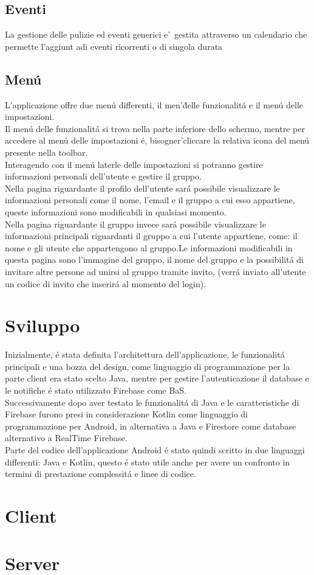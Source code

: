 \subsection{Eventi}
La gestione delle pulizie ed eventi generici e'\ gestita attraverso un calendario
che permette l'aggiunt adi eventi ricorrenti o di singola durata




\subsection{Men\'u}
L'applicazione offre due men\'u differenti, il men'\u delle funzionalit\'a e il men\'u delle impostazioni.\\
Il men\'u delle funzionalit\'a si trova nella parte inferiore dello schermo, mentre per accedere al men\'u delle impostazioni \'e, bisogner'\a cliccare la relativa icona del men\'u presente nella toolbar.\\
Interagendo con il men\'u laterle delle impostazioni si potranno gestire informazioni personali dell'utente e gestire il gruppo.\\
Nella pagina riguardante il profilo dell'utente sar\'a possibile visualizzare le informazioni personali come il nome, l'email e il gruppo a cui esso appartiene, queste informazioni sono modificabili in qualsiasi momento.\\
Nella pagina riguardante il gruppo invece sar\'a possibile visualizzare le informazioni principali riguardanti il gruppo a cui l'utente appartiene, come: il nome e gli utente che appartengono al gruppo.Le informazioni modificabili in questa pagina sono l'immagine del gruppo, il nome del gruppo e la possibilit\'a di invitare altre persone ad unirsi al gruppo tramite invito, (verr\'a inviato all'utente un codice di invito che inserir\'a al momento del login).\\




\section{Sviluppo}                 %
Inizialmente, \'e stata definita l'architettura dell'applicazione, le funzionalit\'a principali e una bozza del design, come linguaggio di programmazione per la parte client era stato scelto Java, mentre per gestire l'autenticazione il database e le notifiche \'e stato utilizzato  Firebase come BaS.\\
Successivamente dopo aver testato le funzionalit\'a di Java e le caratteristiche di Firebase furono presi in considerazione Kotlin come linguaggio di programmazione per Android, in alternativa a Java e Firestore come database alternativo a RealTime Firebase.\\
Parte del codice dell'applicazione Android \'e stato quindi scritto in due linguaggi differenti: Java e Kotlin, questo \'e stato utile anche per avere un confronto in termini di prestazione complessit\'a e linee di codice.


\section{Client}                 %






\section{Server}                 %
